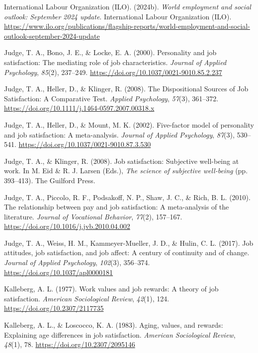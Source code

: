 \documentclass[
]{interact}
\newlength{\cslhangindent}
\newenvironment{CSLReferences}[2] %
 {\begin{list}{}{%
  \setlength{\itemindent}{0pt}
  \setlength{\leftmargin}{0pt}
  \setlength{\parsep}{0pt}
  \ifodd #1
   \setlength{\leftmargin}{\cslhangindent}
   \setlength{\itemindent}{-1\cslhangindent}
  \fi
  \setlength{\itemsep}{#2\baselineskip}}}
 {\end{list}}
\begin{document}
\begin{CSLReferences}{1}{0}
International Labour Organization (ILO). (2024b). \emph{World employment
and social outlook: September 2024 update}. International Labour
Organization (ILO).
\url{https://www.ilo.org/publications/flagship-reports/world-employment-and-social-outlook-september-2024-update}

Judge, T. A., Bono, J. E., \& Locke, E. A. (2000). Personality and job
satisfaction: The mediating role of job characteristics. \emph{Journal
of Applied Psychology}, \emph{85}(2), 237--249.
\url{https://doi.org/10.1037/0021-9010.85.2.237}

Judge, T. A., Heller, D., \& Klinger, R. (2008). The Dispositional
Sources of Job Satisfaction: A Comparative Test. \emph{Applied
Psychology}, \emph{57}(3), 361--372.
\url{https://doi.org/10.1111/j.1464-0597.2007.00318.x}

Judge, T. A., Heller, D., \& Mount, M. K. (2002). Five-factor model of
personality and job satisfaction: A meta-analysis. \emph{Journal of
Applied Psychology}, \emph{87}(3), 530--541.
\url{https://doi.org/10.1037/0021-9010.87.3.530}

Judge, T. A., \& Klinger, R. (2008). Job satisfaction: Subjective
well-being at work. In M. Eid \& R. J. Larsen (Eds.), \emph{The science
of subjective well-being} (pp. 393--413). The Guilford Press.

Judge, T. A., Piccolo, R. F., Podsakoff, N. P., Shaw, J. C., \& Rich, B.
L. (2010). The relationship between pay and job satisfaction: A
meta-analysis of the literature. \emph{Journal of Vocational Behavior},
\emph{77}(2), 157--167. \url{https://doi.org/10.1016/j.jvb.2010.04.002}

Judge, T. A., Weiss, H. M., Kammeyer-Mueller, J. D., \& Hulin, C. L.
(2017). Job attitudes, job satisfaction, and job affect: A century of
continuity and of change. \emph{Journal of Applied Psychology},
\emph{102}(3), 356--374. \url{https://doi.org/10.1037/apl0000181}

Kalleberg, A. L. (1977). Work values and job rewards: A theory of job
satisfaction. \emph{American Sociological Review}, \emph{42}(1), 124.
\url{https://doi.org/10.2307/2117735}

Kalleberg, A. L., \& Loscocco, K. A. (1983). Aging, values, and rewards:
Explaining age differences in job satisfaction. \emph{American
Sociological Review}, \emph{48}(1), 78.
\url{https://doi.org/10.2307/2095146}


\end{CSLReferences}
\end{document}
